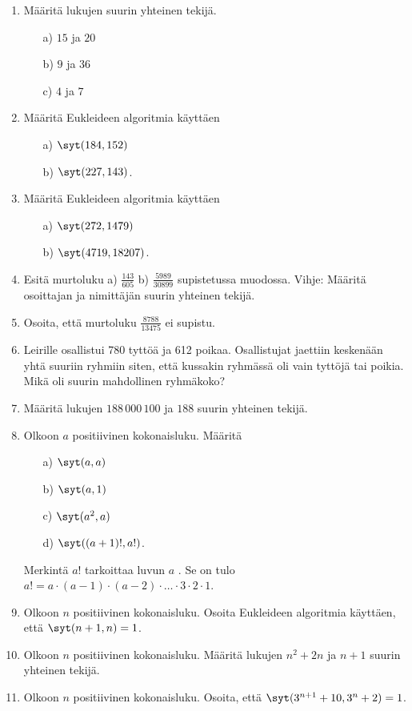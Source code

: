 \begin{enumerate}

\item Määritä lukujen suurin yhteinen tekijä.
\begin{itemize}
\item[a)] $15$ ja $20$
\item[b)] $9$ ja $36$
\item[c)] $4$ ja $7$
\end{itemize}

\item Määritä Eukleideen algoritmia käyttäen
\begin{itemize}
\item[a)] $\syt(184,152)$
\item[b)] $\syt(227,143)$.
\end{itemize}

\item Määritä Eukleideen algoritmia käyttäen
\begin{itemize}
\item[a)] $\syt(272,1479)$
\item[b)] $\syt(4719,18207)$.
\end{itemize}

\item Esitä murtoluku  a) $\frac{143}{605}$  b) $\frac{5989}{30899}$  supistetussa muodossa. Vihje: Määritä osoittajan ja nimittäjän suurin yhteinen tekijä.

\item Osoita, että murtoluku $\frac{8788}{13475}$ ei supistu.

\item Leirille osallistui 780 tyttöä ja 612 poikaa. Osallistujat jaettiin keskenään yhtä suuriin ryhmiin siten, että kussakin ryhmässä oli vain tyttöjä tai poikia. Mikä oli suurin mahdollinen ryhmäkoko?

\item
Määritä lukujen $188\, 000\, 100$ ja $188$ suurin yhteinen tekijä.

\item Olkoon $a$ positiivinen kokonaisluku. Määritä
\begin{itemize}
\item[a)] $\syt(a,a)$
\item[b)] $\syt(a,1)$
\item[c)] $\syt(a^2,a)$
\item[d)] $\syt((a+1)!,a!)$.
\end{itemize}
Merkintä $a!$ tarkoittaa luvun $a$ . Se on tulo $a! = a \cdot (a-1) \cdot (a-2) \cdot \ldots \cdot 3 \cdot 2 \cdot 1$.

\item Olkoon $n$ positiivinen kokonaisluku. Osoita Eukleideen algoritmia käyttäen, että $\syt(n+1,n)=1$.

\item Olkoon $n$ positiivinen kokonaisluku. Määritä lukujen $n^2 + 2n$ ja $n + 1$ suurin yhteinen tekijä.

\item Olkoon $n$ positiivinen kokonaisluku. Osoita, että $\syt(3^{n+1} + 10,3^n + 2)=1$.

\end{enumerate}

